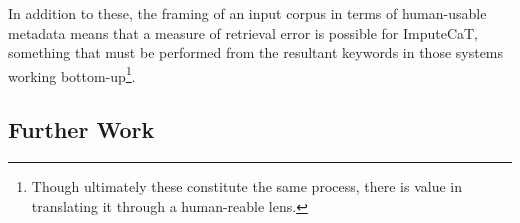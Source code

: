 In addition to these, the framing of an input corpus in terms of human-usable metadata means that a measure of retrieval error is possible for ImputeCaT, something that must be performed from the resultant keywords in those systems working bottom-up\footnote{Though ultimately these constitute the same process, there is value in translating it through a human-reable lens.}.


\subsection{Further Work}
